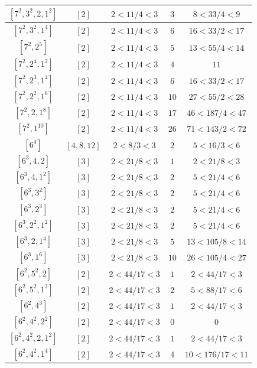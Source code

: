 \documentclass{article}%
\begin{document}
\begin{center}
\begin{longtable}{||c|c|c|c|c||}
$[7^{2}, 3^{2}, 2, 1^{2}]$ & $[2]$ & $2 < 11/4 < 3$ & $3$ & $8 < 33/4 < 9$ \\ \hline 
$[7^{2}, 3^{2}, 1^{4}]$ & $[2]$ & $2 < 11/4 < 3$ & $6$ & $16 < 33/2 < 17$ \\ \hline 
$[7^{2}, 2^{5}]$ & $[2]$ & $2 < 11/4 < 3$ & $5$ & $13 < 55/4 < 14$ \\ \hline 
$[7^{2}, 2^{4}, 1^{2}]$ & $[2]$ & $2 < 11/4 < 3$ & $4$ & $11$ \\ \hline 
$[7^{2}, 2^{3}, 1^{4}]$ & $[2]$ & $2 < 11/4 < 3$ & $6$ & $16 < 33/2 < 17$ \\ \hline 
$[7^{2}, 2^{2}, 1^{6}]$ & $[2]$ & $2 < 11/4 < 3$ & $10$ & $27 < 55/2 < 28$ \\ \hline 
$[7^{2}, 2, 1^{8}]$ & $[2]$ & $2 < 11/4 < 3$ & $17$ & $46 < 187/4 < 47$ \\ \hline 
$[7^{2}, 1^{10}]$ & $[2]$ & $2 < 11/4 < 3$ & $26$ & $71 < 143/2 < 72$ \\ \hline 
$[6^{4}]$ & $[4, 8, 12]$ & $2 < 8/3 < 3$ & $2$ & $5 < 16/3 < 6$ \\ \hline 
$[6^{3}, 4, 2]$ & $[3]$ & $2 < 21/8 < 3$ & $1$ & $2 < 21/8 < 3$ \\ \hline 
$[6^{3}, 4, 1^{2}]$ & $[3]$ & $2 < 21/8 < 3$ & $2$ & $5 < 21/4 < 6$ \\ \hline 
$[6^{3}, 3^{2}]$ & $[3]$ & $2 < 21/8 < 3$ & $2$ & $5 < 21/4 < 6$ \\ \hline 
$[6^{3}, 2^{3}]$ & $[3]$ & $2 < 21/8 < 3$ & $2$ & $5 < 21/4 < 6$ \\ \hline 
$[6^{3}, 2^{2}, 1^{2}]$ & $[3]$ & $2 < 21/8 < 3$ & $2$ & $5 < 21/4 < 6$ \\ \hline 
$[6^{3}, 2, 1^{4}]$ & $[3]$ & $2 < 21/8 < 3$ & $5$ & $13 < 105/8 < 14$ \\ \hline 
$[6^{3}, 1^{6}]$ & $[3]$ & $2 < 21/8 < 3$ & $10$ & $26 < 105/4 < 27$ \\ \hline 
$[6^{2}, 5^{2}, 2]$ & $[2]$ & $2 < 44/17 < 3$ & $1$ & $2 < 44/17 < 3$ \\ \hline 
$[6^{2}, 5^{2}, 1^{2}]$ & $[2]$ & $2 < 44/17 < 3$ & $2$ & $5 < 88/17 < 6$ \\ \hline 
$[6^{2}, 4^{3}]$ & $[2]$ & $2 < 44/17 < 3$ & $1$ & $2 < 44/17 < 3$ \\ \hline 
$[6^{2}, 4^{2}, 2^{2}]$ & $[2]$ & $2 < 44/17 < 3$ & $0$ & $0$ \\ \hline 
$[6^{2}, 4^{2}, 2, 1^{2}]$ & $[2]$ & $2 < 44/17 < 3$ & $1$ & $2 < 44/17 < 3$ \\ \hline 
$[6^{2}, 4^{2}, 1^{4}]$ & $[2]$ & $2 < 44/17 < 3$ & $4$ & $10 < 176/17 < 11$ \\ \hline 

\end{longtable}
\end{center}
\end{document}
